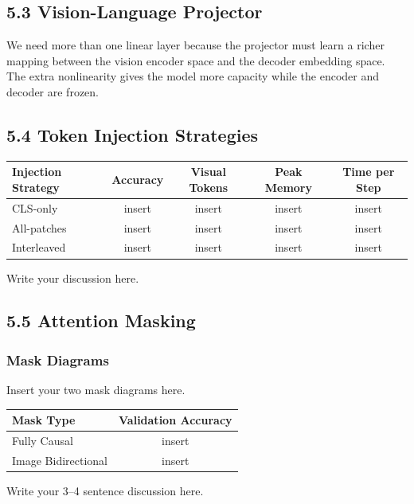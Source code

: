 \documentclass[11pt]{article}
\begin{document}
\subsection*{5.3 Vision-Language Projector}

We need more than one linear layer because the projector must learn a richer mapping between the vision encoder space and the decoder embedding space. The extra nonlinearity gives the model more capacity while the encoder and decoder are frozen.

\subsection*{5.4 Token Injection Strategies}

\begin{center}
\begin{tabular}{l c c c c}
\toprule
Injection Strategy & Accuracy & Visual Tokens & Peak Memory & Time per Step \\
\midrule
CLS-only & insert & insert & insert & insert \\
All-patches & insert & insert & insert & insert \\
Interleaved & insert & insert & insert & insert \\
\bottomrule
\end{tabular}
\end{center}

Write your discussion here.

\subsection*{5.5 Attention Masking}

\subsubsection*{Mask Diagrams}

Insert your two mask diagrams here.

\begin{center}
\begin{tabular}{l c}
\toprule
Mask Type & Validation Accuracy \\
\midrule
Fully Causal & insert \\
Image Bidirectional & insert \\
\bottomrule
\end{tabular}
\end{center}

Write your 3--4 sentence discussion here.
\end{document}
